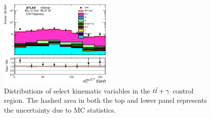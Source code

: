 \begin{figure}[h!]
\begin{center}
\includegraphics[width=0.49\textwidth]{figures/ttGamma/MtMetLep_CRTTGamma_withRatio_log.eps}
\caption[Distributions of select kinematic variables in the $\ttbar+\gamma$ control region]{ Distributions of select kinematic variables in the $\ttbar+\gamma$ control region. The hashed area in both the top and lower panel represents the uncertainty due to MC statistics.}
\label{fig:ttgamma}
\end{center}
\end{figure}





